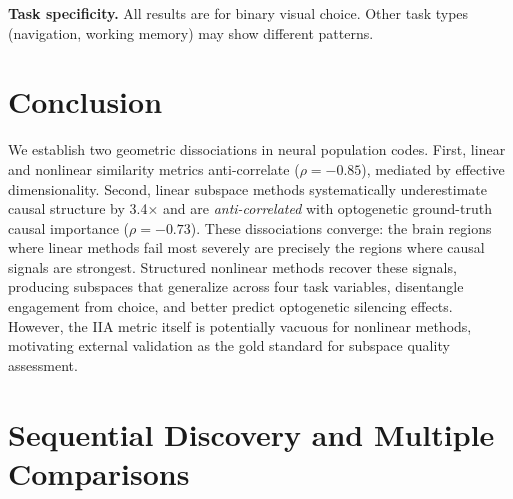 \documentclass{article}
\begin{document}
\textbf{Task specificity.} All results are for binary visual choice. Other task types (navigation, working memory) may show different patterns.

\section{Conclusion}

We establish two geometric dissociations in neural population codes. First, linear and nonlinear similarity metrics anti-correlate ($\rho = -0.85$), mediated by effective dimensionality. Second, linear subspace methods systematically underestimate causal structure by 3.4$\times$ and are \emph{anti-correlated} with optogenetic ground-truth causal importance ($\rho = -0.73$). These dissociations converge: the brain regions where linear methods fail most severely are precisely the regions where causal signals are strongest. Structured nonlinear methods recover these signals, producing subspaces that generalize across four task variables, disentangle engagement from choice, and better predict optogenetic silencing effects. However, the IIA metric itself is potentially vacuous for nonlinear methods, motivating external validation as the gold standard for subspace quality assessment.




\appendix
\section{Sequential Discovery and Multiple Comparisons}
\label{app:sequential}
\end{document}
